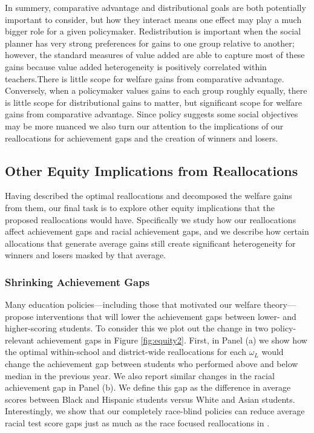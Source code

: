 \documentclass[12pt]{article}
\theoremstyle{definition}
\theoremstyle{definition}
\theoremstyle{definition}
\theoremstyle{definition}
\begin{document}

In summery, comparative advantage and distributional goals are both potentially important to consider, but how they interact means one effect may play a much bigger role for a given policymaker. Redistribution is important when the social planner has very strong preferences for gains to one group relative to another; however, the standard measures of value added are able to capture most of these gains because value added heterogeneity is positively correlated within teachers.There is little scope for welfare gains from comparative advantage. Conversely, when a policymaker values gains to each group roughly equally, there is little scope for distributional gains to matter, but significant scope for welfare gains from comparative advantage. Since policy suggests some social objectives may be more nuanced we also turn our attention to the implications of our reallocations for achievement gaps and the creation of winners and losers.

\subsection{Other Equity Implications from Reallocations}

Having described the optimal reallocations and decomposed the welfare gains from them, our final task is to explore other equity implications that the proposed reallocations would have. Specifically we study how our reallocations affect achievement gaps and racial achievement gaps, and we describe how certain allocations that generate average gains still create significant heterogeneity for winners and losers masked by that average.

\subsubsection{Shrinking Achievement Gaps}

Many education policies---including those that motivated our welfare theory---propose interventions that will lower the achievement gaps between lower- and higher-scoring students. To consider this we plot out the change in two policy-relevant achievement gaps in Figure \ref{fig:equity2}. First, in Panel (a) we show how the optimal within-school and district-wide reallocations for each $\omega_L$ would change the achievement gap between students who performed above and below median in the previous year. We also report similar changes in the racial achievement gap in Panel (b). We define this gap as the difference in average scores between Black and Hispanic students versus White and Asian students. %
Interestingly, we show that our completely race-blind policies can reduce average racial test score gaps just as much as the race focused reallocations in \citet{Delgado2020}.
\end{document}
